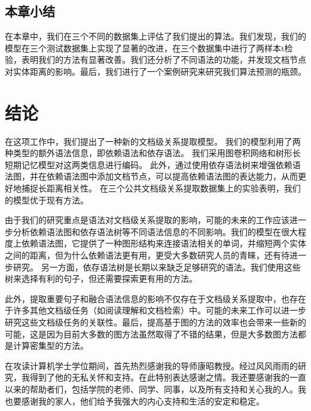 \documentclass[bachelor]{thesis-uestc}
\begin{document}
\section{本章小结} \label{sec:conclusion}

在本章中，我们在三个不同的数据集上评估了我们提出的算法。我们发现，我们的模型在三个测试数据集上实现了显著的改进，在三个数据集中进行了两样本t检验，表明我们的方法有显著改善。我们还分析了不同语法的功能，并发现文档节点对实体距离的影响。最后，我们进行了一个案例研究来研究我们算法预测的瓶颈。\par
\chapter{结论}
在这项工作中，我们提出了一种新的文档级关系提取模型。
我们的模型利用了两种类型的额外语法信息，即依赖语法和依存语法。
我们采用图卷积网络和树形长短期记忆模型对这两类信息进行编码。
此外，通过使用依存语法树来增强依赖语法图，并在依赖语法图中添加文档节点，可以提高依赖语法图的表达能力，从而更好地捕捉长距离相关性。
在三个公共文档级关系提取数据集上的实验表明，我们的模型优于现有方法。\par

由于我们的研究重点是语法对文档级关系提取的影响，可能的未来的工作应该进一步分析依赖语法图和依存语法树等不同语法信息的不同影响。我们的模型在很大程度上依赖语法图，它提供了一种图形结构来连接语法相关的单词，并缩短两个实体之间的距离，但为什么依赖语法更有用，更受大多数研究人员的青睐，还有待进一步研究。
另一方面，依存语法树是长期以来缺乏足够研究的语法。我们使用这些树来选择有利的句子，但还需要探索更有用的方法。\par
此外，提取重要句子和融合语法信息的影响不仅存在于文档级关系提取中，也存在于许多其他文档级任务（如阅读理解和文档检索）中。可能的未来工作可以进一步研究这些文档级任务的关联性。最后，提高基于图的方法的效率也会带来一些新的可能，这是因为目前大多数的图方法虽然取得了不错的结果，但是大多数图方法都是计算密集型的方法。\par

\thesisacknowledgement
在攻读计算机学士学位期间，首先热烈感谢我的导师康昭教授。经过风风雨雨的研究，我得到了他的无私关怀和支持。在此特别表达感谢之情。我还要感谢我的一直以来的帮助者们，包括学院的老师、同学、同事，以及所有支持和关心我的人。我也要感谢我的家人，他们给予我强大的内心支持和生活的安定和稳定。

%

%
%
\end{document}
